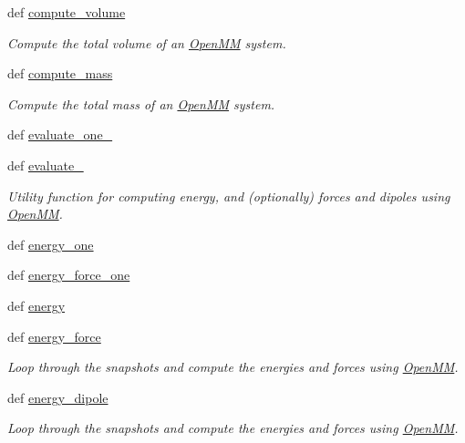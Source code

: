 \begin{DoxyCompactItemize}
def \hyperlink{classforcebalance_1_1openmmio_1_1OpenMM_a0131011c66bf557761c07b3a7678b18c}{compute\-\_\-volume}
\begin{DoxyCompactList}\small\item\em Compute the total volume of an \hyperlink{classforcebalance_1_1openmmio_1_1OpenMM}{Open\-M\-M} system. \end{DoxyCompactList}\item 
def \hyperlink{classforcebalance_1_1openmmio_1_1OpenMM_acc7edd8bb71ea4dba9d07d4367506d7e}{compute\-\_\-mass}
\begin{DoxyCompactList}\small\item\em Compute the total mass of an \hyperlink{classforcebalance_1_1openmmio_1_1OpenMM}{Open\-M\-M} system. \end{DoxyCompactList}\item 
def \hyperlink{classforcebalance_1_1openmmio_1_1OpenMM_af1d80ea225fd5c44d00896bdf58aac29}{evaluate\-\_\-one\-\_\-}
\item 
def \hyperlink{classforcebalance_1_1openmmio_1_1OpenMM_a627218c1174ffe9d8f614d530c314a14}{evaluate\-\_\-}
\begin{DoxyCompactList}\small\item\em Utility function for computing energy, and (optionally) forces and dipoles using \hyperlink{classforcebalance_1_1openmmio_1_1OpenMM}{Open\-M\-M}. \end{DoxyCompactList}\item 
def \hyperlink{classforcebalance_1_1openmmio_1_1OpenMM_a917bbb29c39304ed0215cf556181b175}{energy\-\_\-one}
\item 
def \hyperlink{classforcebalance_1_1openmmio_1_1OpenMM_ace1dbbee0bf2117e08c8c86464bb159f}{energy\-\_\-force\-\_\-one}
\item 
def \hyperlink{classforcebalance_1_1openmmio_1_1OpenMM_ab45c2591e7c02badd4ece587d0d396bc}{energy}
\item 
def \hyperlink{classforcebalance_1_1openmmio_1_1OpenMM_a97b44fc19cf8906dff58b038196086b3}{energy\-\_\-force}
\begin{DoxyCompactList}\small\item\em Loop through the snapshots and compute the energies and forces using \hyperlink{classforcebalance_1_1openmmio_1_1OpenMM}{Open\-M\-M}. \end{DoxyCompactList}\item 
def \hyperlink{classforcebalance_1_1openmmio_1_1OpenMM_a5e3e54f528bed81c3fa9a18918e00952}{energy\-\_\-dipole}
\begin{DoxyCompactList}\small\item\em Loop through the snapshots and compute the energies and forces using \hyperlink{classforcebalance_1_1openmmio_1_1OpenMM}{Open\-M\-M}. \end{DoxyCompactList}\item 

\end{DoxyCompactItemize}
